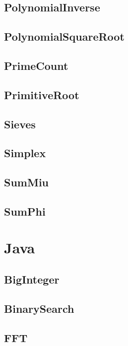 \documentclass{article}
\begin{document}
\subsection{PolynomialInverse}

\subsection{PolynomialSquareRoot}

\subsection{PrimeCount}

\subsection{PrimitiveRoot}

\subsection{Sieves}

\subsection{Simplex}

\subsection{SumMiu}

\subsection{SumPhi}

\section{Java}
\subsection{BigInteger}

\subsection{BinarySearch}

\subsection{FFT}

\end{document}
